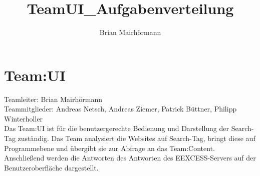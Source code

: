 \documentclass[a4paper,12pt]{article}
\title{TeamUI_Aufgabenverteilung}
\author{Brian Mairhörmann}
\begin{document}
\section{Team:UI}

Teamleiter: Brian Mairhörmann\\
Teammitglieder: Andreas Netsch, Andreas Ziemer, Patrick Büttner, Philipp Winterholler\\
Das Team:UI ist für die benutzergerechte Bedienung und Darstellung der Search-Tag zuständig.
Das Team analysiert die Websites auf Search-Tag, bringt diese auf Programmebene und übergibt sie
zur Abfrage an das Team:Content. Anschließend werden die Antworten des Antworten des EEXCESS-Servers
auf der Benutzeroberfläche dargestellt.
\end{document}
